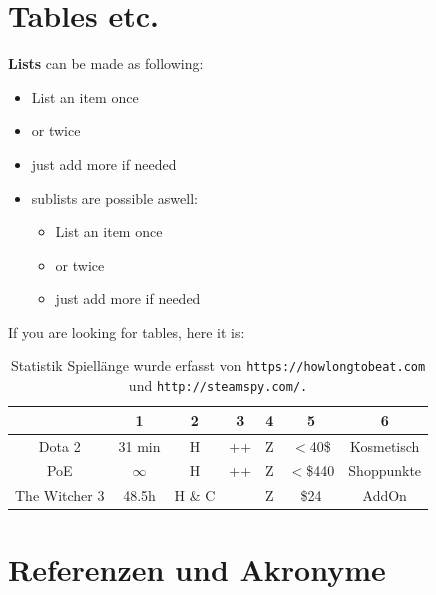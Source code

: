 \documentclass[10pt]{article}
\begin{document}
\section{Tables etc.}

\textbf{Lists} can be made as following:
\begin{itemize}
\item List an item once
\item or twice
\item just add more if needed
\item sublists are possible aswell:
\begin{itemize}
\item List an item once
\item or twice
\item just add more if needed
\end{itemize}
\end{itemize}

If you are looking for tables, here it is:
\begin{table}[H]
\centering
\begin{tabular}{ |c|c|c|c|c|c|c| }
\hline
 & 1 & 2 & 3 & 4 & 5 & 6 \\
\hline
Dota 2 & 31 min & H & ++ & Z & $<$40\$ & Kosmetisch \\
\hline
PoE & $\infty$ & H & ++ & Z & $<$\$440 & Shoppunkte \\
\hline
The Witcher 3 & 48.5h & H \& C &  & Z & \$24 & AddOn \\
\hline
\end{tabular}
\caption{Statistik Spiellänge wurde erfasst von \texttt{https://howlongtobeat.com} und \texttt{http://steamspy.com/.}}
\label{table:1}
\end{table}

\section{Referenzen und Akronyme}

\printglossaries


%
%

%


\listoffigures
\listoftables

\end{document}
